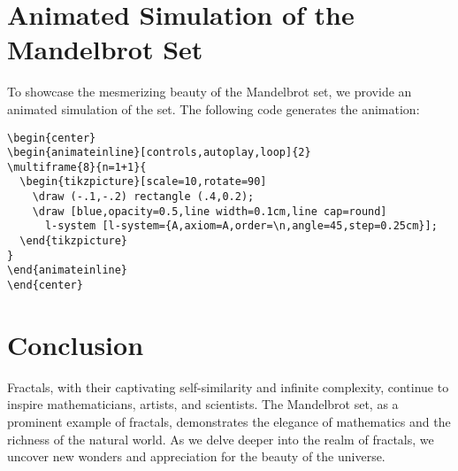 \documentclass{article}
\begin{document}
\newpage

\section{Animated Simulation of the Mandelbrot Set}
\begin{center}
\begin{animateinline}{2}
\end{animateinline}
\end{center}

To showcase the mesmerizing beauty of the Mandelbrot set, we provide an animated simulation of the set. The following code generates the animation:

\begin{verbatim}
\begin{center}
\begin{animateinline}[controls,autoplay,loop]{2}
\multiframe{8}{n=1+1}{
  \begin{tikzpicture}[scale=10,rotate=90]
    \draw (-.1,-.2) rectangle (.4,0.2);
    \draw [blue,opacity=0.5,line width=0.1cm,line cap=round]
      l-system [l-system={A,axiom=A,order=\n,angle=45,step=0.25cm}];
  \end{tikzpicture}
}
\end{animateinline}
\end{center}
\end{verbatim}

\section{Conclusion}
\label{sec:conclusion}
Fractals, with their captivating self-similarity and infinite complexity, continue to inspire mathematicians, artists, and scientists. The Mandelbrot set, as a prominent example of fractals, demonstrates the elegance of mathematics and the richness of the natural world. As we delve deeper into the realm of fractals, we uncover new wonders and appreciation for the beauty of the universe.
\end{document}
